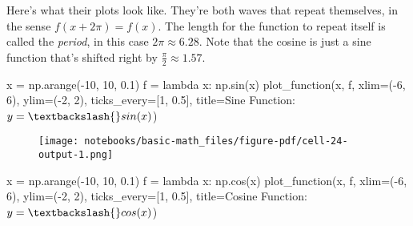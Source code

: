 \documentclass[
  letterpaper,
  DIV=11,
  numbers=noendperiod]{scrreprt}
\newenvironment{Shaded}{\begin{snugshade}}{\end{snugshade}}
\newcommand{\DecValTok}[1]{\textcolor[rgb]{0.68,0.00,0.00}{#1}}
\newcommand{\FloatTok}[1]{\textcolor[rgb]{0.68,0.00,0.00}{#1}}
\newcommand{\KeywordTok}[1]{\textcolor[rgb]{0.00,0.23,0.31}{#1}}
\newcommand{\NormalTok}[1]{\textcolor[rgb]{0.00,0.23,0.31}{#1}}
\newcommand{\OperatorTok}[1]{\textcolor[rgb]{0.37,0.37,0.37}{#1}}
\newcommand{\StringTok}[1]{\textcolor[rgb]{0.13,0.47,0.30}{#1}}
\begin{document}
Here's what their plots look like. They're both waves that repeat
themselves, in the sense \(f(x + 2\pi) = f(x)\). The length for the
function to repeat itself is called the \emph{period}, in this case
\(2\pi \approx 6.28\). Note that the cosine is just a sine function
that's shifted right by \(\frac{\pi}{2} \approx 1.57\).

\begin{Shaded}
\begin{Highlighting}[]
\NormalTok{x }\OperatorTok{=}\NormalTok{ np.arange(}\OperatorTok{{-}}\DecValTok{10}\NormalTok{, }\DecValTok{10}\NormalTok{, }\FloatTok{0.1}\NormalTok{)}
\NormalTok{f }\OperatorTok{=} \KeywordTok{lambda}\NormalTok{ x: np.sin(x)}
\NormalTok{plot\_function(x, f, xlim}\OperatorTok{=}\NormalTok{(}\OperatorTok{{-}}\DecValTok{6}\NormalTok{, }\DecValTok{6}\NormalTok{), ylim}\OperatorTok{=}\NormalTok{(}\OperatorTok{{-}}\DecValTok{2}\NormalTok{, }\DecValTok{2}\NormalTok{),  ticks\_every}\OperatorTok{=}\NormalTok{[}\DecValTok{1}\NormalTok{, }\FloatTok{0.5}\NormalTok{], }
\NormalTok{              title}\OperatorTok{=}\StringTok{\textquotesingle{}Sine Function: $y=\textbackslash{}sin(x)$\textquotesingle{}}\NormalTok{)}
\end{Highlighting}
\end{Shaded}

\begin{figure}[H]

{\centering \texttt{[image: notebooks/basic-math\_files/figure-pdf/cell-24-output-1.png]}

}

\end{figure}

\begin{Shaded}
\begin{Highlighting}[]
\NormalTok{x }\OperatorTok{=}\NormalTok{ np.arange(}\OperatorTok{{-}}\DecValTok{10}\NormalTok{, }\DecValTok{10}\NormalTok{, }\FloatTok{0.1}\NormalTok{)}
\NormalTok{f }\OperatorTok{=} \KeywordTok{lambda}\NormalTok{ x: np.cos(x)}
\NormalTok{plot\_function(x, f, xlim}\OperatorTok{=}\NormalTok{(}\OperatorTok{{-}}\DecValTok{6}\NormalTok{, }\DecValTok{6}\NormalTok{), ylim}\OperatorTok{=}\NormalTok{(}\OperatorTok{{-}}\DecValTok{2}\NormalTok{, }\DecValTok{2}\NormalTok{), ticks\_every}\OperatorTok{=}\NormalTok{[}\DecValTok{1}\NormalTok{, }\FloatTok{0.5}\NormalTok{], }
\NormalTok{              title}\OperatorTok{=}\StringTok{\textquotesingle{}Cosine Function: $y=\textbackslash{}cos(x)$\textquotesingle{}}\NormalTok{)}
\end{Highlighting}
\end{Shaded}
\end{document}
